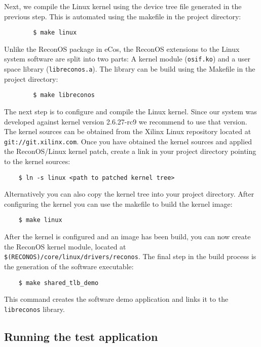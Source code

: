 \documentclass[DIV15,a4paper]{scrartcl}
\begin{document}
Next, we compile the Linux kernel using the device tree file generated in the previous step. This is automated using the makefile in the project directory:

\begin{verbatim}
        $ make linux
\end{verbatim}

Unlike the ReconOS package in eCos, the ReconOS extensions to the Linux system software are split into two parts: A kernel module (\texttt{osif.ko}) and a user space library
(\texttt{libreconos.a}). The library can be build using the Makefile in the project directory:

\begin{verbatim}
        $ make libreconos
\end{verbatim}

The next step is to configure and compile the Linux kernel. Since our system was developed against kernel
version 2.6.27-rc9 we recommend to use that version. The kernel sources can be obtained from the Xilinx
Linux repository located at \texttt{git://git.xilinx.com}. Once you have obtained the kernel sources and
applied the ReconOS/Linux kernel patch, create a link in your project directory pointing to the kernel sources:

\begin{verbatim}
	$ ln -s linux <path to patched kernel tree>
\end{verbatim}

Alternatively you can also copy the kernel tree into your project directory. After configuring the kernel you can use the makefile to build the kernel image:

\begin{verbatim}
	$ make linux
\end{verbatim}

After the kernel is configured and an image has been build, you can now create the ReconOS kernel module, located at \texttt{\$(RECONOS)/core/linux/drivers/reconos}.
The final step in the build process is the generation of the software executable:

\begin{verbatim}
	$ make shared_tlb_demo
\end{verbatim}

This command creates the software demo application and links it to the \texttt{libreconos} library. 

\subsection{Running the test application}
\end{document}
